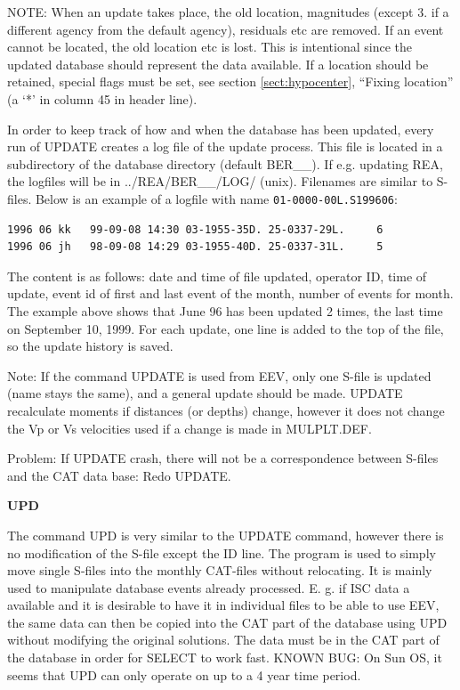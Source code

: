 NOTE: When an update takes place, the old location, magnitudes 
(except 3. if a different agency from the default agency), residuals 
etc are removed. If an event cannot be located, the old location etc 
is lost. This is intentional since the updated database should represent 
the data available. If a location should be retained, special flags 
must be set, see section \ref{sect:hypocenter}, 
``Fixing location'' (a `*' in column 45 in header line). 

In order to keep track of how and when the database has been updated, 
every run of UPDATE creates a log file 
of the update process. This file is located in a subdirectory of the 
database directory (default BER\_\_). If e.g. updating REA, the 
logfiles will be in ../REA/BER\_\_/LOG/ (unix). Filenames are similar 
to S-files. Below is an example of a logfile with name 
\texttt{01-0000-00L.S199606}:


\begin{verbatim}
1996 06 kk   99-09-08 14:30 03-1955-35D. 25-0337-29L.     6 
1996 06 jh   98-09-08 14:29 03-1955-40D. 25-0337-31L.     5 
\end{verbatim}

The content is as follows: date and time of file updated, operator ID, time of update, event id of first and last event of the month, number of events for month. The example above shows that June 96 has been updated 2 times, the last time on September 10, 1999. For each update, one line is added to the top of the file, so the update history is saved. 

Note: If the command UPDATE is used from EEV, only one S-file is 
updated (name stays the same), and a general update should be made. \newline
UPDATE recalculate moments if distances (or depths) change, however 
it does not change the Vp or Vs velocities used if a change is made 
in MULPLT.DEF. 

Problem: If UPDATE crash, there will not be a correspondence between 
S-files and the CAT data base: Redo UPDATE. 

\textbf{UPD}
 
The command UPD is very similar to the UPDATE command, however there is no modification of the S-file except the ID line. The program is used to simply move single S-files into the monthly CAT-files without relocating. It is mainly used to manipulate database events already processed. E. g. if ISC data a available and it is desirable to have it in individual files to be able to use EEV, the same data can then be copied into the CAT part of the database using UPD without modifying the original solutions. The data must be in the CAT part of the database in order for SELECT to work fast. KNOWN BUG: On Sun OS, it seems that UPD can only operate on up to a 4 year time period.  


